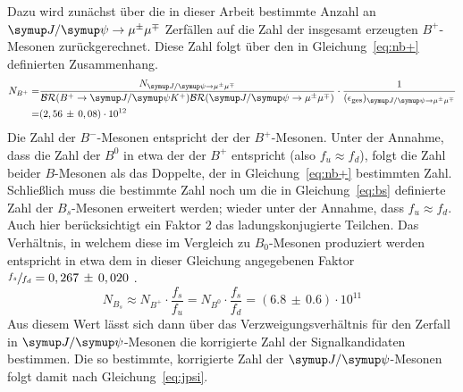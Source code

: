 %

Dazu wird zunächst über die in dieser Arbeit bestimmte Anzahl an $\kontroll$ Zerfällen auf die Zahl der insgesamt erzeugten $B^{+}$-Mesonen zurückgerechnet. Diese Zahl folgt über den in Gleichung~\eqref{eq:nb+} definierten Zusammenhang.
%
\begin{equation}
  \begin{split}
  N_{B^{+}}=&\frac{N_{\kontroll}}{\mathcal{BR}(B^{+}\rightarrow\jpsi K^{+})\mathcal{BR}(\kontroll)}\cdot\frac{1}{(\epsilon_\text{ges})_{\kontroll}}\\
  =&(2,56\,\pm\,0,08)\cdot10^{12}
  \end{split}
  \label{eq:nb+}
\end{equation}
%
Die Zahl der $B^{-}$-Mesonen entspricht der der $B^{+}$-Mesonen. Unter der Annahme, dass die Zahl der $B^0$ in etwa der der $B^{+}$ entspricht (also $f_u\approx f_d$), folgt die Zahl beider $B$-Mesonen als das Doppelte, der in Gleichung~\eqref{eq:nb+} bestimmten Zahl. Schließlich muss die bestimmte Zahl noch um die in Gleichung~\eqref{eq:bs} definierte Zahl der $B_s$-Mesonen erweitert werden; wieder unter der Annahme, dass
$f_u\approx f_d$. Auch hier berücksichtigt ein Faktor $2$ das ladungskonjugierte Teilchen. Das Verhältnis, in welchem diese im Vergleich zu $B_0$-Mesonen produziert werden entspricht in etwa dem in dieser Gleichung angegebenen Faktor $\sfrac{f_s}{f_d}=0,267\,\pm\,0,020$ \cite{fs}.
%
\begin{equation}
  N_{B_s}\approx N_{B^+}\cdot\frac{f_s}{f_u} = N_{B^0}\cdot\frac{f_s}{f_d}=(6.8\,\pm\,0.6)\cdot10^{11}
  \label{eq:bs}
\end{equation}
%
Aus diesem Wert lässt sich dann über das Verzweigungsverhältnis für den Zerfall in $\jpsi$-Mesonen die korrigierte Zahl der Signalkandidaten bestimmen. Die so bestimmte, korrigierte Zahl der $\jpsi$-Mesonen folgt damit nach Gleichung~\eqref{eq:jpsi}.
